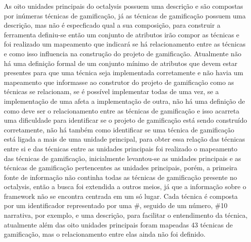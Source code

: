 As oito unidades principais do octalysis possuem uma descrição e são compostas por inúmeras técnicas de gamificação, já as técnicas de gamificação possuem uma descrição, mas não é especficado qual a sua composição, para construir a ferramenta definiu-se então um conjunto de atributos irão compor as técnicas e foi realizado um mapeamento que indicará se há relacionamento entre as técnicas e como isso influencia na construção do projeto de gamificação. Atualmente não há uma definição formal de um conjunto mínimo de atributos que devem estar presentes para que uma técnica seja implementada corretamente e não havia um mapeamento que informasse ao construtor do projeto de gamificação como as técnicas se relacionam, se é possível implementar todas de uma vez, se a implementação de uma afeta a implementação de outra, não há uma definição de como deve ser o relacionamento entre as técnicas de gamificação e isso acarreta uma dificuldade para identificar se o projeto de gamificação está sendo construído corretamente, não há também como identificar se uma técnica de gamificação está ligada a mais de uma unidade principal, para obter essa relação das técnicas entre si e das técnicas entre as unidades principais foi realizado o mapeamento das técnicas de gamificação, inicialmente levantou-se as unidades principais e as técnicas de gamificação pertencentes as unidades principais, porém, a primeira fonte de informação não continha todas as técnicas de gamificação presente no octalysis, então a busca foi extendida a outros meios, já que a informação sobre o framework não se encontra centrada em um só lugar. Cada técnica é composta por um identificador representado por uma \#, seguido de um número, \#10 narrativa, por exemplo, e uma descrição, para facilitar o entendimento da técnica, atualmente além das oito unidades principais foram mapeadas 43 técnicas de gamificação, mas o relacionamento entre elas ainda não foi definido.

